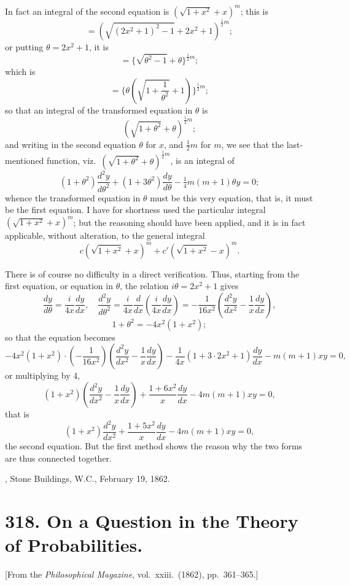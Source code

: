 \documentclass[11pt,a4paper]{article}
\theoremstyle{plain}
\begin{document}
In fact an integral of the second equation is $(\sqrt{1+x^2} + x)^m$; this is
\[
= (\sqrt{(2x^2+1)^2 - 1} + 2x^2 + 1)^{\frac{1}{2}m};
\]
or putting $\theta = 2x^2 + 1$, it is
\[
= \{\sqrt{\theta^2 - 1} + \theta\}^{\frac{1}{2}m};
\]
which is
\[
= \{\theta(\sqrt{1+\frac{1}{\theta^2}} + 1)\}^{\frac{1}{2}m};
\]
so that an integral of the transformed equation in $\theta$ is
\[
(\sqrt{1+\theta^2} + \theta)^{\frac{1}{2}m};
\]
and writing in the second equation $\theta$ for $x$, and $\frac{1}{2}m$ for $m$, we see that the last-mentioned function, viz.\ $(\sqrt{1+\theta^2} + \theta)^{\frac{1}{2}m}$, is an integral of
\[
(1 + \theta^2)\frac{d^2y}{d\theta^2} + (1 + 3\theta^2)\frac{dy}{d\theta} - \tfrac{1}{4}m(m+1)\theta y = 0;
\]
whence the transformed equation in $\theta$ must be this very equation, that is, it must be the first equation. I have for shortness used the particular integral $(\sqrt{1+x^2} + x)^m$; but the reasoning should have been applied, and it is in fact applicable, without alteration, to the general integral
\[
c(\sqrt{1+x^2} + x)^m + c'(\sqrt{1+x^2} - x)^m.
\]

\newpage
There is of course no difficulty in a direct verification. Thus, starting from the first equation, or equation in $\theta$, the relation $i\theta = 2x^2 + 1$ gives
\[
\frac{dy}{d\theta} = \frac{i}{4x}\frac{dy}{dx}, \quad \frac{d^2y}{d\theta^2} = \frac{i}{4x}\frac{d}{dx}\left(\frac{i}{4x}\frac{dy}{dx}\right) = -\frac{1}{16x^2}\left(\frac{d^2y}{dx^2} - \frac{1}{x}\frac{dy}{dx}\right),
\]
\[
1 + \theta^2 = -4x^2(1+x^2);
\]
so that the equation becomes
\[
-4x^2(1+x^2) \cdot \left(-\frac{1}{16x^2}\right)\left(\frac{d^2y}{dx^2} - \frac{1}{x}\frac{dy}{dx}\right) - \frac{1}{4x}(1+3\cdot 2x^2+1)\frac{dy}{dx} - m(m+1)xy = 0,
\]
or multiplying by 4,
\[
(1+x^2)\left(\frac{d^2y}{dx^2} - \frac{1}{x}\frac{dy}{dx}\right) + \frac{1+6x^2}{x}\frac{dy}{dx} - 4m(m+1)xy = 0,
\]
that is
\[
(1+x^2)\frac{d^2y}{dx^2} + \frac{1+5x^2}{x}\frac{dy}{dx} - 4m(m+1)xy = 0,
\]
the second equation. But the first method shows the reason why the two forms are thus connected together.

\medskip
{}, Stone Buildings, W.C., February 19, 1862.


\newpage
\section*{318. On a Question in the Theory of Probabilities.}

[From the \textit{Philosophical Magazine}, vol.\ xxiii.\ (1862), pp.\ 361--365.]
\end{document}
